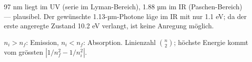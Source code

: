 \begin{kontrolle}
97 nm liegt im UV (serie im Lyman-Bereich), 1.88 µm im IR (Paschen-Bereich)
--- plausibel. Der gewünschte 1.13-µm-Photone läge im IR mit nur 1.1 eV;
da der erste angeregte Zustand 10.2 eV verlangt, ist keine Anregung möglich.
\end{kontrolle}

\begin{merksatz}
$n_i>n_f$: Emission, $n_i<n_f$: Absorption. Linienzahl $\binom{n}{2}$;
höchste Energie kommt vom grössten $|1/n_f^2 - 1/n_i^2|$.
\end{merksatz}

